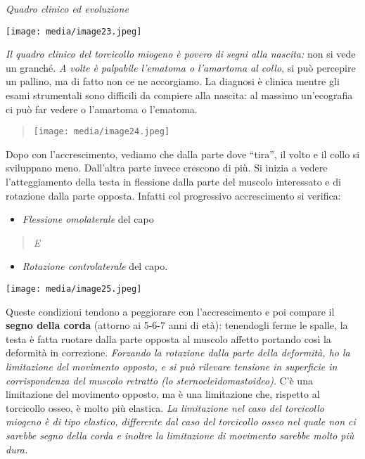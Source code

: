 \documentclass[]{article}
\begin{document}
\emph{Quadro clinico ed evoluzione}

\texttt{[image: media/image23.jpeg]}

\emph{Il quadro clinico del torcicollo miogeno è povero di segni alla
nascita:} non si vede un granché. \emph{A volte è palpabile l'ematoma o
l'amartoma al collo}, si può percepire un pallino, ma di fatto non ce ne
accorgiamo. La diagnosi è clinica mentre gli esami strumentali sono
difficili da compiere alla nascita: al massimo un'ecografia ci può far
vedere o l'amartoma o l'ematoma.

\begin{quote}
\texttt{[image: media/image24.jpeg]}
\end{quote}

Dopo con l'accrescimento, vediamo che dalla parte dove ``tira'', il
volto e il collo si sviluppano meno. Dall'altra parte invece crescono di
più. Si inizia a vedere l'atteggiamento della testa in flessione dalla
parte del muscolo interessato e di rotazione dalla parte opposta.
Infatti col progressivo accrescimento si verifica:

\begin{itemize}
\item
  \emph{Flessione omolaterale} del capo
\end{itemize}

\begin{quote}
\emph{E}
\end{quote}

\begin{itemize}
\item
  \emph{Rotazione controlaterale} del capo.
\end{itemize}

\texttt{[image: media/image25.jpeg]}

Queste condizioni tendono a peggiorare con l'accrescimento e poi compare
il \textbf{segno della corda} (attorno ai 5-6-7 anni di età): tenendogli
ferme le spalle, la testa è fatta ruotare dalla parte opposta al muscolo
affetto portando così la deformità in correzione. \emph{Forzando la
rotazione dalla parte della deformità, ho la limitazione del movimento
opposto, e si può rilevare tensione in superficie in corrispondenza del
muscolo retratto (lo sternocleidomastoideo)}. C'è una limitazione del
movimento opposto, ma è una limitazione che, rispetto al torcicollo
osseo, è molto più elastica. \emph{La limitazione nel caso del
torcicollo miogeno è di tipo elastico, differente dal caso del
torcicollo osseo nel quale non ci sarebbe segno della corda e inoltre la
limitazione di movimento sarebbe molto più dura.}
\end{document}
